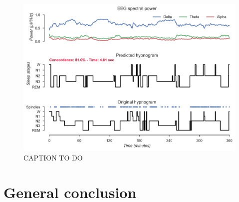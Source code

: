 \begin{figure}[htb]
	\includegraphics[width=\textwidth]{Fig/Discussion/autoscore.png}
	\caption[]{CAPTION TO DO}
	\label{fig:disc:methods:future:auto:autoscore}
\end{figure}


\cleardoublepage
\chapter{General conclusion}
\label{disc:conclusion}
